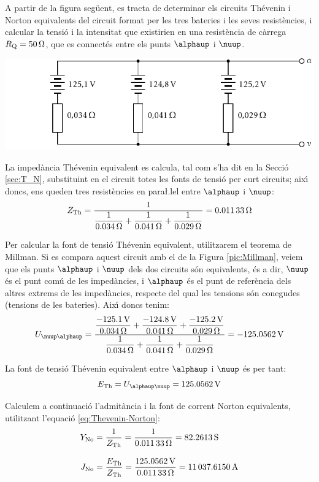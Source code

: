 \begin{exemple}
A partir de la figura seg\"{u}ent, es tracta de determinar els circuits
Th\'{e}venin i Norton equivalents del circuit format per les tres
bateries i les seves resist\`{e}ncies, i calcular la tensi\'{o} i la
intensitat que existirien en una resist\`{e}ncia de c\`{a}rrega
$R_\mathrm{Q}=\SI{50}{\ensuremath{\mathrm{\Omega}}}$, que es connect\'{e}s entre els punts $\alphaup$
i $\nuup$.

\includegraphics{Imatges/Cap-Fonaments-Millman-Exemple.pdf}

La imped\`{a}ncia Th\'{e}venin equivalent es calcula, tal com s'ha dit en la Secci\'{o} \ref{sec:T_N},
substituint en el circuit totes les fonts de tensi\'{o} per curt circuits; aix\'{\i} doncs, ens
queden tres resist\`{e}ncies en para{\l.l}el entre $\alphaup$ i $\nuup$:
\[
Z_\mathrm{Th} = \frac{1}{\dfrac{1}{\SI{0,034}{\ensuremath{\mathrm{\Omega}}}} +
\dfrac{1}{\SI{0,041}{\ensuremath{\mathrm{\Omega}}}} + \dfrac{1}{\SI{0,029}{\ensuremath{\mathrm{\Omega}}}}} =
\SI{0,01133}{\ensuremath{\mathrm{\Omega}}}
\]

Per calcular la font de tensi\'{o} Th\'{e}venin equivalent, utilitzarem el
teorema de Millman. Si es compara aquest circuit amb el de la Figura
\vref{pic:Millman}, veiem que els punts $\alphaup$ i $\nuup$ dels dos
circuits s\'{o}n equivalents, \'{e}s a dir, $\nuup$ \'{e}s el punt com\'{u} de les
imped\`{a}ncies, i $\alphaup$ \'{e}s el punt de refer\`{e}ncia dels altres extrems
de les imped\`{a}ncies, respecte del qual les tensions s\'{o}n conegudes
(tensions de les bateries). Aix\'{\i} doncs tenim:
\[
U_{\nuup\alphaup} = \frac{\dfrac{\SI{-125,1}{V}}{\SI{0,034}{\ohm}} +
\dfrac{\SI{-124,8}{V}}{\SI{0,041}{\ohm}} +
\dfrac{\SI{-125,2}{V}}{\SI{0,029}{\ohm}}}{\dfrac{1}{\SI{0,034}{\ohm}}
+ \dfrac{1}{\SI{0,041}{\ohm}} + \dfrac{1}{\SI{0,029}{\ohm}}} =
\SI{-125,0562}{V}
\]

La font de tensi\'{o}  Th\'{e}venin equivalent entre $\alphaup$ i $\nuup$ \'{e}s per
tant:
\[
E\ped{Th} = U_{\alphaup\nuup} = \SI{125,0562}{V}
\]

Calculem a continuaci\'{o} l'admit\`{a}ncia i la font de corrent  Norton equivalents, utilitzant
l'equaci\'{o} \eqref{eq:Thevenin-Norton}:
\begin{align*}
    Y_\mathrm{No} &= \frac{1}{Z_\mathrm{Th}} = \frac{1}{\SI{0,01133}{\ensuremath{\mathrm{\Omega}}}} = \SI{82,2613}{S}
    \\[2ex]
    J_\mathrm{No} &= \frac{E_\mathrm{Th}}{Z_\mathrm{Th}} =
    \frac{\SI{125,0562}{V}}{\SI{0,01133}{\ensuremath{\mathrm{\Omega}}}}= \SI{11037,6150}{A}
\end{align*}


\end{exemple}
